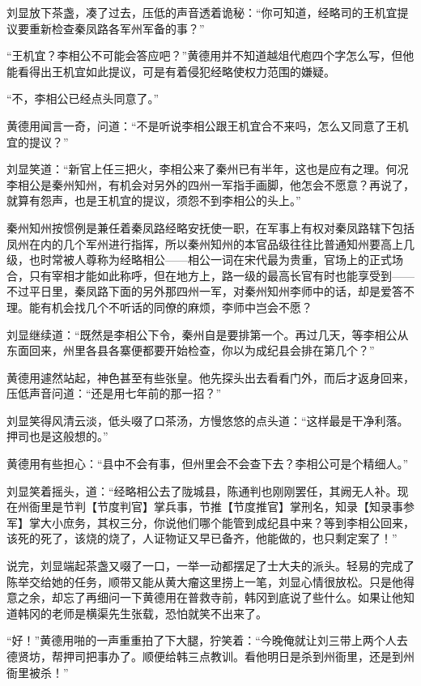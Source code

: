 刘显放下茶盏，凑了过去，压低的声音透着诡秘：“你可知道，经略司的王机宜提议要重新检查秦凤路各军州军备的事？”

“王机宜？李相公不可能会答应吧？”黄德用并不知道越俎代庖四个字怎么写，但他能看得出王机宜如此提议，可是有着侵犯经略使权力范围的嫌疑。

“不，李相公已经点头同意了。”

黄德用闻言一奇，问道：“不是听说李相公跟王机宜合不来吗，怎么又同意了王机宜的提议？”

刘显笑道：“新官上任三把火，李相公来了秦州已有半年，这也是应有之理。何况李相公是秦州知州，有机会对另外的四州一军指手画脚，他怎会不愿意？再说了，就算有怨声，也是王机宜的提议，须怨不到李相公的头上。”

秦州知州按惯例是兼任着秦凤路经略安抚使一职，在军事上有权对秦凤路辖下包括凤州在内的几个军州进行指挥，所以秦州知州的本官品级往往比普通知州要高上几级，也时常被人尊称为经略相公——相公一词在宋代最为贵重，官场上的正式场合，只有宰相才能如此称呼，但在地方上，路一级的最高长官有时也能享受到——不过平日里，秦凤路下面的另外那四州一军，对秦州知州李师中的话，却是爱答不理。能有机会找几个不听话的同僚的麻烦，李师中岂会不愿？

刘显继续道：“既然是李相公下令，秦州自是要排第一个。再过几天，等李相公从东面回来，州里各县各寨便都要开始检查，你以为成纪县会排在第几个？”

黄德用遽然站起，神色甚至有些张皇。他先探头出去看看门外，而后才返身回来，压低声音问道：“还是用七年前的那一招？”

刘显笑得风清云淡，低头啜了口茶汤，方慢悠悠的点头道：“这样最是干净利落。押司也是这般想的。”

黄德用有些担心：“县中不会有事，但州里会不会查下去？李相公可是个精细人。”

刘显笑着摇头，道：“经略相公去了陇城县，陈通判也刚刚罢任，其阙无人补。现在州衙里是节判【节度判官】掌兵事，节推【节度推官】掌刑名，知录【知录事参军】掌大小庶务，其权三分，你说他们哪个能管到成纪县中来？等到李相公回来，该死的死了，该烧的烧了，人证物证又早已备齐，他能做的，也只剩定案了！”

说完，刘显端起茶盏又啜了一口，一举一动都摆足了士大夫的派头。轻易的完成了陈举交给她的任务，顺带又能从黄大瘤这里捞上一笔，刘显心情很放松。只是他得意之余，却忘了再细问一下黄德用在普救寺前，韩冈到底说了些什么。如果让他知道韩冈的老师是横渠先生张载，恐怕就笑不出来了。

“好！”黄德用啪的一声重重拍了下大腿，狞笑着：“今晚俺就让刘三带上两个人去德贤坊，帮押司把事办了。顺便给韩三点教训。看他明日是杀到州衙里，还是到州衙里被杀！”

